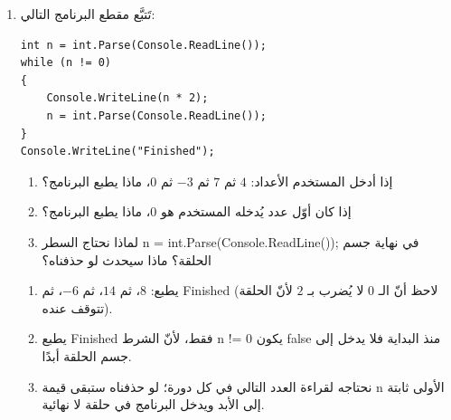 \documentclass[14pt]{extarticle}
\begin{document}
\begin{enumerate}[itemsep=2em]
\item تَتبَّع مقطع البرنامج التالي:
\begin{boxCode}
\begin{english}
\begin{verbatim}
int n = int.Parse(Console.ReadLine());
while (n != 0)
{
    Console.WriteLine(n * 2);
    n = int.Parse(Console.ReadLine());
}
Console.WriteLine("Finished");
\end{verbatim}
\end{english}
\end{boxCode}
\begin{enumerate}
    \item إذا أدخل المستخدم الأعداد: $4$ ثم $7$ ثم $-3$ ثم $0$، ماذا يطبع البرنامج؟
    \item إذا كان أوّل عدد يُدخله المستخدم هو $0$، ماذا يطبع البرنامج؟
    \item لماذا نحتاج السطر \textenglish{n = int.Parse(Console.ReadLine());} في نهاية جسم الحلقة؟ ماذا سيحدث لو حذفناه؟
\end{enumerate}
\ifwithsols
\begin{boxSolution}
\begin{enumerate}
    \item يطبع: $8$، ثم $14$، ثم $-6$، ثم \textenglish{Finished} (لاحظ أنّ الـ $0$ لا يُضرب بـ $2$ لأنّ الحلقة تتوقف عنده).
    \item يطبع \textenglish{Finished} فقط، لأنّ الشرط \textenglish{n != 0} يكون \textenglish{false} منذ البداية فلا يدخل إلى جسم الحلقة أبدًا.
    \item نحتاجه لقراءة العدد التالي في كل دورة؛ لو حذفناه ستبقى قيمة \textenglish{n} الأولى ثابتة إلى الأبد ويدخل البرنامج في حلقة لا نهائية.
\end{enumerate}
\end{boxSolution}
\fi
\filbreak


\end{enumerate}
\end{document}
